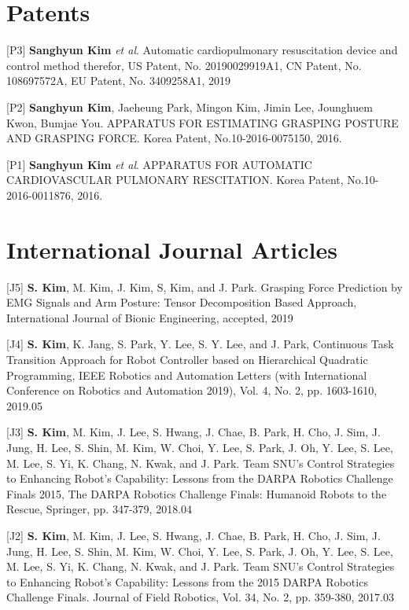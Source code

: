 \documentclass[margin,line]{res}
\begin{document}
\begin{resume}
\section{\sc Patents} 
[P3]  \textbf{Sanghyun Kim} \textit{et al}. Automatic cardiopulmonary resuscitation device and control method therefor, US Patent, No. 20190029919A1, CN Patent, No. 108697572A, EU Patent, No. 3409258A1, 2019

[P2] \textbf{Sanghyun Kim}, {Jaeheung Park}, Mingon Kim, Jimin Lee, Jounghuem Kwon, Bumjae You. 
APPARATUS FOR ESTIMATING GRASPING POSTURE AND GRASPING FORCE.
Korea Patent, No.10-2016-0075150, 2016.

[P1] \textbf{Sanghyun Kim} \textit{et al}. 
APPARATUS FOR AUTOMATIC CARDIOVASCULAR PULMONARY RESCITATION.
Korea Patent, No.10-2016-0011876, 2016.
%

\section{\sc International Journal Articles}


[J5] \textbf{S. Kim}, M. Kim, J. Kim, S, Kim, and J. Park.
Grasping Force Prediction by EMG Signals and Arm Posture: Tensor Decomposition Based Approach,
International Journal of Bionic Engineering, accepted, 2019

[J4] \textbf{S. Kim}, K. Jang, S. Park, Y. Lee, S. Y. Lee, and J. Park, Continuous Task Transition Approach for Robot Controller based on Hierarchical Quadratic Programming, IEEE Robotics and Automation Letters (with International Conference on Robotics and Automation 2019), Vol. 4, No. 2, pp. 1603-1610, 2019.05

[J3] \textbf{S. Kim}, M. Kim, J. Lee, S. Hwang, J. Chae, B. Park, H. Cho, J. Sim, J. Jung, H. Lee, S. Shin, M. Kim, W. Choi, Y. Lee, S. Park, J. Oh, Y. Lee, S. Lee, M. Lee, S. Yi, K. Chang, N. Kwak, and {J. Park}.
Team SNU’s Control Strategies to Enhancing Robot’s Capability: Lessons from the DARPA Robotics Challenge Finals 2015, The DARPA Robotics Challenge Finals: Humanoid Robots to the Rescue, Springer, pp. 347-379, 2018.04

[J2] \textbf{S. Kim}, M. Kim, J. Lee, S. Hwang, J. Chae, B. Park, H. Cho, J. Sim, J. Jung, H. Lee, S. Shin, M. Kim, W. Choi, Y. Lee, S. Park, J. Oh, Y. Lee, S. Lee, M. Lee, S. Yi, K. Chang, N. Kwak, and {J. Park}.
Team SNU’s Control Strategies to Enhancing Robot’s Capability: Lessons from the 2015 DARPA Robotics Challenge Finals. Journal of Field Robotics, Vol. 34, No. 2, pp. 359-380, 2017.03


\end{resume}
\end{document}
